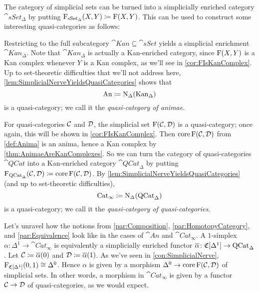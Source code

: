 \begin{exm}\label{exm:SimplicialNerve}
	The category of simplicial sets can be turned into a simplicially enriched category $\cat{sSet}_\Delta$ by putting $\operatorname{F}_{\mathrm{sSet}_\Delta}(X,Y)\coloneqq \operatorname{F}(X,Y)$. This can be used to construct some interesting quasi-categories as follows:
	\begin{alphanumerate}
		\item Restricting to the full subcategory $\cat{Kan}\subseteq \cat{sSet}$ yields a simplicial enrichment $\cat{Kan}_\Delta$. Note that $\cat{Kan}_\Delta$ is actually a Kan-enriched category, since $\operatorname{F}(X,Y)$ is a Kan complex whenever $Y$ is a Kan complex, as we'll see in \cref{cor:FIsKanComplex}. Up to set-theoretic difficulties that we'll not address here, \cref{lem:SimplicialNerveYieldsQuasiCategories} shows that\label{enum:An}
		\begin{equation*}
			\mathrm{An}\coloneqq \operatorname{N}_\Delta(\mathrm{Kan}_\Delta)
		\end{equation*}
		is a quasi-category; we call it the \emph{quasi-category of animae}.
		\item For quasi-categories $\mathcal{C}$ and $\mathcal{D}$, the simplicial set $\operatorname{F}(\mathcal{C},\mathcal{D})$ is a quasi-category; once again, this will be shown in \cref{cor:FIsKanComplex}. Then $\operatorname{core} \operatorname{F}(\mathcal{C},\mathcal{D})$ from \cref{def:Anima} is an anima, hence a Kan complex by \cref{thm:AnimaeAreKanComplexes}. So we can turn the category of quasi-categories $\cat{QCat}$ into a Kan-enriched category $\cat{QCat}_\Delta$ by putting $\operatorname{F}_{\mathrm{QCat}_\Delta}(\mathcal{C},\mathcal{D})\coloneqq \operatorname{core}\operatorname{F}(\mathcal{C},\mathcal{D})$. By \cref{lem:SimplicialNerveYieldsQuasiCategories} (and up to set-theoretic difficulties),\label{enum:CatInfty}
		\begin{equation*}
			\mathrm{Cat}_\infty\coloneqq \operatorname{N}_\Delta(\mathrm{QCat}_\Delta)
		\end{equation*}
		is a quasi-category; we call it the \emph{quasi-category of  quasi-categories}.
	\end{alphanumerate}
	Let's unravel how the notions from \cref{par:Composition}, \cref{par:HomotopyCategory}, and \cref{par:Equivalence} look like in the cases of $\cat{An}$ and $\cat{Cat}_\infty$. A $1$-simplex $\alpha\colon \Delta^1\rightarrow\cat{Cat}_\infty$ is equivalently a simplicially enriched functor $\ov\alpha\colon\CC[\Delta^1]\rightarrow\cat{QCat}_\Delta$. Let $\Cc\coloneqq \ov\alpha(0)$ and $\Dd\coloneqq \ov\alpha(1)$. As we've seen in \cref{con:SimplicialNerve},  $\operatorname{F}_{\mathfrak{C}[\Delta^1]}(0,1)\cong \Delta^0$. Hence $\alpha$ is given by a morphism $\Delta^0\rightarrow\operatorname{core} \operatorname{F}(\mathcal{C},\mathcal{D})$ of simplicial sets. In other words, a morphism in $\cat{Cat}_\infty$ is given by a functor $\mathcal{C}\rightarrow\mathcal{D}$ of quasi-categories, as we would expect.
	

\end{exm}
